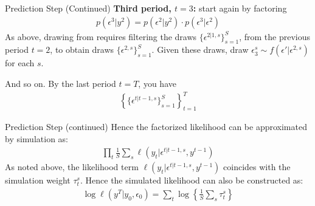 \begin{frame}{Prediction Step (Continued)}
\textbf{Third period, $t = 3$:} start again by factoring
\begin{eqnarray*}
p(\epsilon^3 | y^2) = p(\epsilon^2 | y^2) \cdot p(\epsilon^3 | \epsilon^2)
\end{eqnarray*}
As above, drawing from  requires filtering the draws $\{ \epsilon^{2|1,s}\}_{s=1}^S$, from the previous period $t = 2$, to obtain draws $\{ \epsilon^{2,s}\}_{s=1}^S$. Given these draws, draw $\epsilon_3^s \sim f(\epsilon' | \epsilon^{2,s})$ for each $s$.

And so on. By the last period $t = T$, you have
\begin{eqnarray*}
\left\{ \{ \epsilon^{t|t-1,s}\}_{s=1}^S \right\}_{t=1}^T
\end{eqnarray*}
\end{frame}

\begin{frame}{Prediction Step (continued)}
Hence the factorized likelihood can be approximated by simulation as:
\begin{eqnarray*}
\prod_t \frac{1}{S} \sum_s \ell (y_t | \epsilon^{t|t-1,s},y^{t-1})
\end{eqnarray*}
As noted above, the likelihood term $\ell(y_t | \epsilon^{t | t-1,s},y^{t-1})$ coincides with the simulation weight $\tau_t^s$. Hence the simulated likelihood can also be constructed as:
\begin{eqnarray*}
\log \ell (y^T | y_0, \epsilon_0) = \sum_t \log \left\{ \frac{1}{S} \sum_s \tau_t^s \right\}
\end{eqnarray*}
\end{frame}

